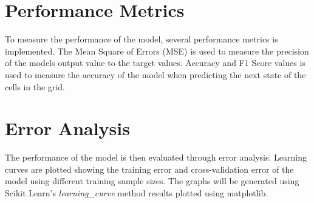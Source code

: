 \section{Performance Metrics}
    To measure the performance of the model, several performance metrics is implemented. The Mean Square of Errors (MSE) is used to measure the precision of the models output value to the target values. Accuracy and F1 Score values is used to measure the accuracy of the model when predicting the next state of the cells in the grid.

\section{Error Analysis}
    The performance of the model is then evaluated through error analysis. Learning curves are plotted showing the training error and cross-validation error of the model using different training sample sizes. The graphs will be generated using Scikit Learn's \textit{learning\_curve} method results plotted using matplotlib.
